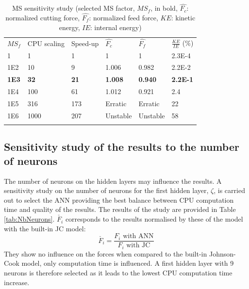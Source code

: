 \documentclass[preprint,12pt,times]{elsarticle}
\begin{document}
%
\begin{table}[!h]
\begin{center}
\caption{\label{tab:MS} MS sensitivity study (selected MS factor, $MS_f$, in bold, $\hat{F_c}$: normalized cutting force, $\hat{F_f}$: normalized feed force, $KE$: kinetic energy, $IE$: internal energy)}
\begin{tabular}{llllll}
\hline\noalign{\smallskip}
$MS_f$ & CPU scaling & Speed-up & $\hat{F_c}$ & $\hat{F_f}$ & $\frac{KE}{IE}$ (\%)\\
\noalign{\smallskip}\hline\noalign{\smallskip}
1 & 1 & 1 & 1 & 1 & 2.3E-4\\
1E2 & 10 & 9 & 1.006 & 0.982 & 2.2E-2\\
\textbf{1E3} & \textbf{32} & \textbf{21} & \textbf{1.008} & \textbf{0.940} & \textbf{2.2E-1}\\
1E4 & 100 & 61 & 1.012 & 0.921 & 2.4\\
1E5 & 316 & 173 & Erratic & Erratic & 22\\
1E6 & 1000 & 207 & Unstable & Unstable & 58\\
\noalign{\smallskip}\hline
\end{tabular}
\end{center}
\end{table}
%

\subsection{Sensitivity study of the results to the number of neurons}
\label{subsec:nberneu}

The number of neurons on the hidden layers may influence the results. A sensitivity study on the number of neurons for the first hidden layer, $\zeta$, is carried out to select the ANN providing the best balance between CPU computation time and quality of the results. The results of the study are provided in Table \ref{tab:NbNeurons}. $\check{F_i}$ corresponds to the results normalised by these of the model with the built-in JC model:
%
\begin{equation}
\check{F_i} = \frac{F_i\text{ with ANN}}{F_i\text{ with JC}}
\end{equation}
%
They show no influence on the forces when compared to the built-in Johnson-Cook model, only computation time is influenced. A first hidden layer with 9 neurons is therefore selected as it leads to the lowest CPU computation time increase.
\end{document}
